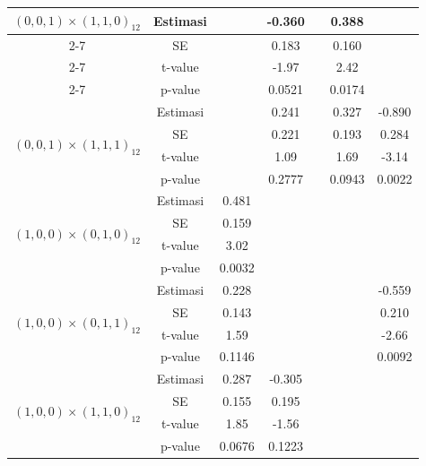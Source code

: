 \begin{enumerate}[label=\alph*.]
\begin{longtable}{|c|c|c|c|c|c|c|}
            \multirow{4}{*}{$(0,0,1)\times(1,1,0)_{12}$}
            & Estimasi &  & -0.360 &  & 0.388 &  \\ \cline{2-7}
            & SE       &  & 0.183  &  & 0.160 &  \\ \cline{2-7}
            & t-value  &  & -1.97  &  & 2.42  &  \\ \cline{2-7}
            & p-value  &  & 0.0521 &  & 0.0174 &  \\ \hline

            \multirow{4}{*}{$(0,0,1)\times(1,1,1)_{12}$}
            & Estimasi &  & 0.241 &  & 0.327 & -0.890 \\ \cline{2-7}
            & SE       &  & 0.221 &  & 0.193 & 0.284  \\ \cline{2-7}
            & t-value  &  & 1.09  &  & 1.69  & -3.14 \\ \cline{2-7}
            & p-value  &  & 0.2777 &  & 0.0943 & 0.0022 \\ \hline

            \multirow{4}{*}{$(1,0,0)\times(0,1,0)_{12}$}
            & Estimasi & 0.481 &  &  &  &  \\ \cline{2-7}
            & SE       & 0.159 &  &  &  &  \\ \cline{2-7}
            & t-value  & 3.02  &  &  &  &  \\ \cline{2-7}
            & p-value  & 0.0032 &  &  &  &  \\ \hline

            \multirow{4}{*}{$(1,0,0)\times(0,1,1)_{12}$}
            & Estimasi & 0.228 &  &  &  & -0.559 \\ \cline{2-7}
            & SE       & 0.143 &  &  &  & 0.210  \\ \cline{2-7}
            & t-value  & 1.59  &  &  &  & -2.66 \\ \cline{2-7}
            & p-value  & 0.1146 &  &  &  & 0.0092 \\ \hline

            \multirow{4}{*}{$(1,0,0)\times(1,1,0)_{12}$}
            & Estimasi & 0.287 & -0.305 &  &  &  \\ \cline{2-7}
            & SE       & 0.155 & 0.195  &  &  &  \\ \cline{2-7}
            & t-value  & 1.85  & -1.56  &  &  &  \\ \cline{2-7}
            & p-value  & 0.0676 & 0.1223 &  &  &  \\ \hline


\end{longtable}
\end{enumerate}
